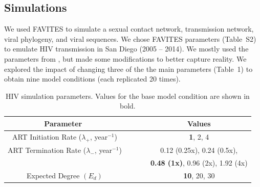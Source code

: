 \documentclass[a4paper,11pt]{article}
\newcommand{\authorcite}[1]{\citeauthor{#1}\supercite{#1}}
\begin{document}
\subsection{Simulations}
We used FAVITES to simulate a sexual contact network, transmission network, viral phylogeny, and viral sequences. 
We chose  FAVITES parameters (Table~S2) to emulate  HIV transmission in San Diego (2005 -- 2014).
We mostly used the parameters from \authorcite{Moshiri2018},
but made some modifications to better capture reality.
We explored the impact of changing three of the the main parameters (Table~1) to obtain nine model conditions (each replicated 20 times).



\begin{table}[!t]
\begin{center}
\begin{tabular}{c c}
\toprule
\textbf{Parameter~~~~~~} & \textbf{Values}\\
\toprule
ART Initiation Rate ($\lambda_+$, year$^{-1}$)~~~~~~ & \textbf{1}, 2, 4\\
\hdashline
ART Termination Rate ($\lambda_-$, year$^{-1}$)~~~~~~ & 0.12 (0.25x), 0.24 (0.5x),\\
~~~~~~ & \textbf{0.48 (1x)}, 0.96 (2x), 1.92 (4x)\\
\hdashline
Expected Degree $\left(E_d\right)$~~~~~~ & \textbf{10}, 20, 30\\
\bottomrule
\end{tabular}
\end{center}
\caption{HIV simulation parameters. Values for the base model condition are shown in bold.}
\label{tab:favites}
\end{table}
\end{document}
